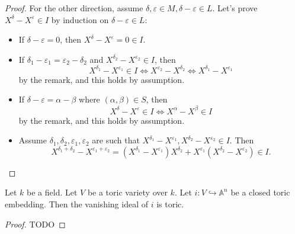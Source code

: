 \begin{proof}
  For the other direction, assume $\delta, \varepsilon \in M, \delta - \varepsilon \in L$.
  Let's prove $X^\delta - X^\varepsilon \in I$ by induction on $\delta - \varepsilon \in L$:
  \begin{itemize}
    \item If $\delta - \varepsilon = 0$, then $X^\delta - X^\varepsilon = 0 \in I$.
    \item If $\delta_1 - \varepsilon_1 = \varepsilon_2 - \delta_2$
      and $X^{\delta_2} - X^{\varepsilon_2} \in I$, then
      \[
        X^{\delta_1} - X^{\varepsilon_1} \in I \iff X^{\varepsilon_2} - X^{\delta_2}
          \iff X^{\delta_1} - X^{\varepsilon_1}
      \]
      by the remark, and this holds by assumption.
    \item If $\delta - \varepsilon = \alpha - \beta$ where $(\alpha, \beta) \in S$, then
      \[
        X^\delta - X^\varepsilon \in I \iff X^\alpha - X^\beta \in I
      \]
      by the remark, and this holds by assumption.
    \item Assume $\delta_1, \delta_2, \varepsilon_1, \varepsilon_2$ are such that
      $X^{\delta_1} - X^{\varepsilon_1}, X^{\delta_2} - X^{\varepsilon_2} \in I$.
      Then
      \[
        X^{\delta_1 + \delta_2} - X^{\varepsilon_1 + \varepsilon_2}
          = (X^{\delta_1} - X^{\varepsilon_1})X^{\delta_2}
            + X^{\varepsilon_1}(X^{\delta_2} - X^{\varepsilon_2})
          \in I.
      \]
  \end{itemize}
\end{proof}


\begin{proposition}
  \label{5-3-van-tor-emb}

  Let $k$ be a field.
  Let $V$ be a toric variety over $k$.
  Let $i : V \hookrightarrow \mathbb{A}^n$ be a closed toric embedding.
  Then the vanishing ideal of $i$ is toric.
\end{proposition}
\begin{proof}

  TODO
\end{proof}
